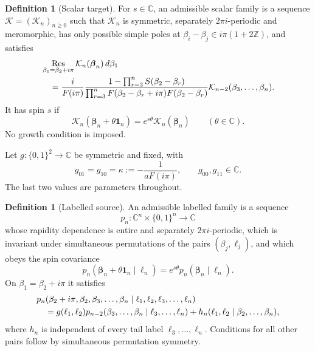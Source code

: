 \documentclass[11pt,reqno]{amsart}
\theoremstyle{definition}
\newtheorem{definition}[theorem]{Definition}
\theoremstyle{remark}
\newcommand{\C}{\mathbb C}
\newcommand{\Z}{\mathbb Z}
\newcommand{\cK}{\mathcal K}
\newcommand{\one}{\mathbf 1}
\newcommand{\Res}{\operatorname*{Res}}
\begin{document}
\begin{definition}[Scalar target]
\label{def:target}
For $s\in\C$, an admissible scalar family is a sequence
$\cK=(\cK_n)_{n\ge0}$ such that $\cK_n$ is symmetric, separately
$2\pi i$-periodic and meromorphic, has only possible simple poles at
$\beta_i-\beta_j\in i\pi(1+2\Z)$, and satisfies
\begin{align}
 &\Res_{\beta_1=\beta_2+i\pi}\cK_n(\boldsymbol\beta_n)\,d\beta_1
 \notag\\
 &\quad=\frac{i}{F(i\pi)}
 \frac{1-\prod_{r=3}^nS(\beta_2-\beta_r)}
 {\prod_{r=3}^nF(\beta_2-\beta_r+i\pi)F(\beta_2-\beta_r)}
 \cK_{n-2}(\beta_3,\ldots,\beta_n).
 \label{eq:target-residue}
\end{align}
It has spin $s$ if
\begin{equation}
 \cK_n(\boldsymbol\beta_n+\theta\one_n)
 =e^{s\theta}\cK_n(\boldsymbol\beta_n)
 \qquad(\theta\in\C).
 \label{eq:target-spin}
\end{equation}
No growth condition is imposed.
\end{definition}

Let $g:\{0,1\}^2\to\C$ be symmetric and fixed, with
\begin{equation}
 g_{01}=g_{10}=\kappa:=-\frac1{aF(i\pi)},
 \qquad g_{00},g_{11}\in\C.
 \label{eq:g}
\end{equation}
The last two values are parameters throughout.

\begin{definition}[Labelled source]
\label{def:source}
An admissible labelled family is a sequence
\begin{equation}
 p_n:\C^n\times\{0,1\}^n\longrightarrow\C
 \end{equation}
whose rapidity dependence is entire and separately $2\pi i$-periodic,
which is invariant under simultaneous permutations of the pairs
$(\beta_j,\ell_j)$, and which obeys the spin covariance
\begin{equation}
 p_n(\boldsymbol\beta_n+\theta\one_n\mid\boldsymbol\ell_n)
 =e^{s\theta}p_n(\boldsymbol\beta_n\mid\boldsymbol\ell_n).
 \label{eq:p-spin}
\end{equation}
On $\beta_1=\beta_2+i\pi$ it satisfies
\begin{align}
 &p_n(\beta_2+i\pi,\beta_2,\beta_3,\ldots,\beta_n
       \mid\ell_1,\ell_2,\ell_3,\ldots,\ell_n)
 \notag\\
 &\quad=g(\ell_1,\ell_2)
 p_{n-2}(\beta_3,\ldots,\beta_n\mid\ell_3,\ldots,\ell_n)
 +h_n(\ell_1,\ell_2\mid\beta_2,\ldots,\beta_n),
 \label{eq:p-recurrence}
\end{align}
where $h_n$ is independent of every tail label
$\ell_3,\ldots,\ell_n$.  Conditions for all other pairs follow by
simultaneous permutation symmetry.
\end{definition}
\end{document}

